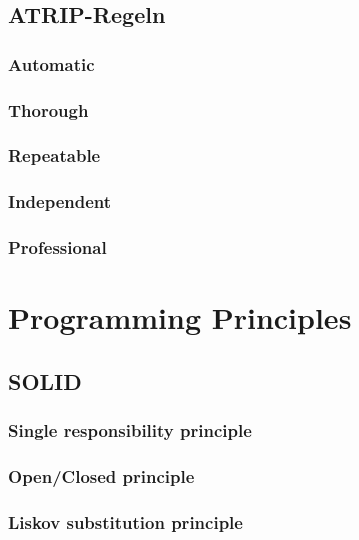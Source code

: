 \documentclass[12pt,a4paper,titlepage,ngerman,pdftex]{report}
\begin{document}
    \subsection{ATRIP-Regeln}

    \subsubsection{Automatic}

    \subsubsection{Thorough}\label{subsec:thorough}

    \subsubsection{Repeatable}

    \subsubsection{Independent}

    \subsubsection{Professional}

    \section{Programming Principles}

    \subsection{SOLID}\label{subsec:solid}
    
    \subsubsection{Single responsibility principle}

    \subsubsection{Open/Closed principle}

    \subsubsection{Liskov substitution principle}
\end{document}
